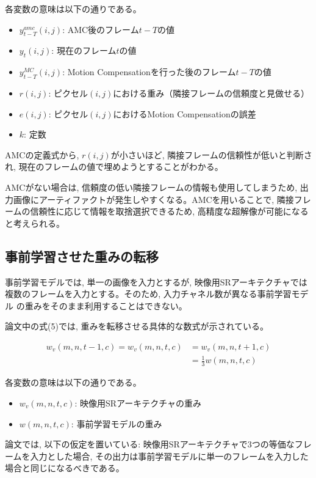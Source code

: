 \documentclass[dvipdfmx,a4j,10pt, twocolumn]{jsarticle}
\begin{document}
各変数の意味は以下の通りである。
\begin{itemize}
    \item $y_{t-T}^{amc}(i,j)$: AMC後のフレーム$t-T$の値
    \item $y_t(i,j)$: 現在のフレーム$t$の値
    \item $y_{t-T}^{MC}(i,j)$: Motion Compensationを行った後のフレーム$t-T$の値
    \item $r(i,j)$: ピクセル$(i,j)$における重み（隣接フレームの信頼度と見做せる）
    \item $e(i,j)$: ピクセル$(i,j)$におけるMotion Compensationの誤差
    \item $k$: 定数
\end{itemize}

AMCの定義式から, $r(i,j)$が小さいほど, 
隣接フレームの信頼性が低いと判断され, 現在のフレームの値で埋めようとすることがわかる。

AMCがない場合は, 信頼度の低い隣接フレームの情報も使用してしまうため, 
出力画像にアーティファクトが発生しやすくなる。AMCを用いることで,
隣接フレームの信頼性に応じて情報を取捨選択できるため, 高精度な超解像が可能になると考えられる。

\subsection*{事前学習させた重みの転移}

事前学習モデルでは, 単一の画像を入力とするが, 映像用SRアーキテクチャでは
複数のフレームを入力とする。そのため, 入力チャネル数が異なる事前学習モデル
の重みをそのまま利用することはできない。

論文中の式(5)では, 重みを転移させる具体的な数式が示されている。

\begin{align*}
w_v(m, n, t- 1, c) = w_v(m, n, t, c) &= w_v(m, n, t+ 1, c)\\
&= \frac{1}{3}w(m, n, t, c) \tag{5}
\end{align*}

各変数の意味は以下の通りである。
\begin{itemize}
    \item $w_v(m,n,t,c)$: 映像用SRアーキテクチャの重み
    \item $w(m,n,t,c)$: 事前学習モデルの重み
\end{itemize}


論文では, 以下の仮定を置いている:
映像用SRアーキテクチャで3つの等価なフレームを入力とした場合, 
その出力は事前学習モデルに単一のフレームを入力した場合と同じになるべきである。
\end{document}
